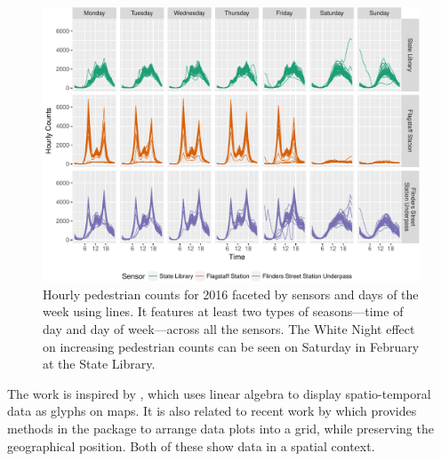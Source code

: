 \documentclass[article]{jss}
\theoremstyle{definition}
\theoremstyle{definition}
\theoremstyle{definition}
\theoremstyle{remark}
\begin{document}
\begin{CodeChunk}
\begin{figure}

{\centering \includegraphics[width=\textwidth]{figure/facet-time-1} 

}

\caption[Hourly pedestrian counts for 2016 faceted by
sensors and days of the week using lines. It features at least two types
of seasons---time of day and day of week---across all the sensors. The
White Night effect on increasing pedestrian counts can be seen on
Saturday in February at the State Library.]{Hourly pedestrian counts for 2016 faceted by
sensors and days of the week using lines. It features at least two types
of seasons---time of day and day of week---across all the sensors. The
White Night effect on increasing pedestrian counts can be seen on
Saturday in February at the State Library.}\label{fig:facet-time}
\end{figure}
\end{CodeChunk}







The work is inspired by \citet{Wickham2012glyph}, which uses linear
algebra to display spatio-temporal data as glyphs on maps. It is also
related to recent work by \citet{R-geofacet} which provides methods in
the  package to arrange data plots into a grid, while
preserving the geographical position. Both of these show data in a
spatial context.
\end{document}
